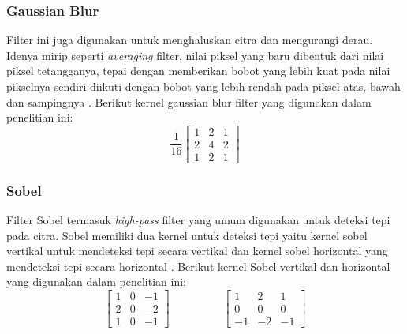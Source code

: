 \subsubsection{Gaussian Blur}
Filter ini juga digunakan untuk menghaluskan citra dan mengurangi derau. Idenya mirip seperti \textit{averaging} filter, nilai piksel yang baru dibentuk dari nilai piksel tetangganya, tepai dengan memberikan bobot yang lebih kuat pada nilai pikselnya sendiri diikuti dengan bobot yang lebih rendah pada piksel atas, bawah dan sampingnya . Berikut kernel gaussian blur filter yang digunakan dalam penelitian ini:
\begin{equation*}
    \label{kernel:mean2}
    \frac{1}{16}
    \left[
    \begin{matrix}
        1 & 2 & 1 \\
        2 & 4 & 2 \\
        1 & 2 & 1
    \end{matrix}
    \right]
\end{equation*}

\subsubsection{Sobel}
Filter Sobel termasuk \textit{high-pass} filter yang umum digunakan untuk deteksi tepi pada citra. Sobel memiliki dua kernel untuk deteksi tepi yaitu kernel sobel vertikal untuk mendeteksi tepi secara vertikal dan kernel sobel horizontal yang mendeteksi tepi secara horizontal . Berikut kernel Sobel vertikal dan horizontal yang digunakan dalam penelitian ini:
\begin{equation*}
    \label{kernel:sobel-h}
    \left[
    \begin{matrix}
        1 & 0 & -1 \\
        2 & 0 & -2 \\
        1 & 0 & -1
    \end{matrix}
    \right]
    \hspace{2cm}
    \left[
        \begin{matrix}
        1 & 2 & 1 \\
        0 & 0 & 0 \\
        -1 & -2 & -1
    \end{matrix}
    \right]
\end{equation*}

